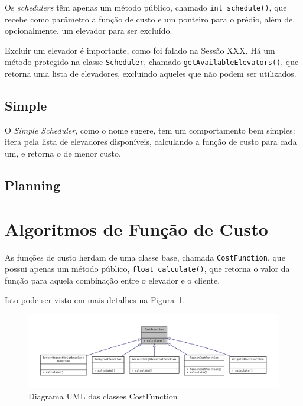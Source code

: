 Os \textit{schedulers} têm apenas um método público, chamado \texttt{int
  schedule()}, que recebe como parâmetro a função de custo e um ponteiro para o
prédio, além de, opcionalmente, um elevador para ser excluído.

Excluir um elevador é importante, como foi falado na Sessão XXX. Há um método
protegido na classe \texttt{Scheduler}, chamado
\texttt{getAvailableElevators()}, que retorna uma lista de elevadores, excluindo
aqueles que não podem ser utilizados.

\subsection{\label{model:schedulers:simple}Simple}
O \textit{Simple Scheduler}, como o nome sugere, tem um comportamento bem
simples: itera pela lista de elevadores disponíveis, calculando a função de
custo para cada um, e retorna o de menor custo.

\subsection{\label{model:schedulers:planning}Planning}
\lipsum[5]

\section{\label{model:costfunctions}Algoritmos de Função de Custo}
As funções de custo herdam de uma classe base, chamada \texttt{CostFunction},
que possui apenas um método público, \texttt{float calculate()}, que retorna o
valor da função para aquela combinação entre o elevador e o cliente.

Isto pode ser visto em mais detalhes na Figura~\ref{fig:model:costfunction:uml:base}.

\begin{figure}[htb]
  \centering
  \includegraphics[scale=0.8]{doc/latex/class_cost_function__inherit__graph}
  \caption{Diagrama UML das classes CostFunction}
  \label{fig:model:costfunction:uml:base}
\end{figure}

